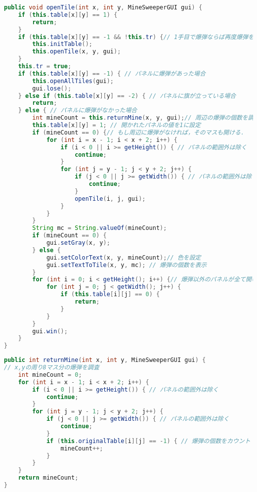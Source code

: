 \documentclass[a4j,11pt]{jsarticle}
\begin{document}
\begin{lstlisting}[caption=\ttfamily openTile, label=src:openTile, language=Java]
public void openTile(int x, int y, MineSweeperGUI gui) {
    if (this.table[x][y] == 1) {
        return;
    }
    if (this.table[x][y] == -1 && !this.tr) {// 1手目で爆弾ならば再度爆弾をセット
        this.initTable();
        this.openTile(x, y, gui);
    }
    this.tr = true;
    if (this.table[x][y] == -1) { // パネルに爆弾があった場合
        this.openAllTiles(gui);
        gui.lose();
    } else if (this.table[x][y] == -2) { // パネルに旗が立っている場合
        return;
    } else { // パネルに爆弾がなかった場合
        int mineCount = this.returnMine(x, y, gui);// 周辺の爆弾の個数を調査
        this.table[x][y] = 1; // 開かれたパネルの値を1に設定
        if (mineCount == 0) {// もし周辺に爆弾がなければ，そのマスも開ける．
            for (int i = x - 1; i < x + 2; i++) {
                if (i < 0 || i >= getHeight()) { // パネルの範囲外は除く
                    continue;
                }
                for (int j = y - 1; j < y + 2; j++) {
                    if (j < 0 || j >= getWidth()) { // パネルの範囲外は除く
                        continue;
                    }
                    openTile(i, j, gui);
                }
            }
        }
        String mc = String.valueOf(mineCount);
        if (mineCount == 0) {
            gui.setGray(x, y);
        } else {
            gui.setColorText(x, y, mineCount);// 色を設定
            gui.setTextToTile(x, y, mc); // 爆弾の個数を表示
        }
        for (int i = 0; i < getHeight(); i++) {// 爆弾以外のパネルが全て開いているか確認
            for (int j = 0; j < getWidth(); j++) {
                if (this.table[i][j] == 0) {
                    return;
                }
            }
        }
        gui.win();
    }
}
\end{lstlisting}
\begin{lstlisting}[caption=\ttfamily returnMine, label=src:returnMine, language=Java]
public int returnMine(int x, int y, MineSweeperGUI gui) {
// x,yの周り8マス分の爆弾を調査
    int mineCount = 0;
    for (int i = x - 1; i < x + 2; i++) {
        if (i < 0 || i >= getHeight()) { // パネルの範囲外は除く
            continue;
        }
        for (int j = y - 1; j < y + 2; j++) {
            if (j < 0 || j >= getWidth()) { // パネルの範囲外は除く
                continue;
            }
            if (this.originalTable[i][j] == -1) { // 爆弾の個数をカウント
                mineCount++;
            }
        }
    }
    return mineCount;
}
\end{lstlisting}
\end{document}
